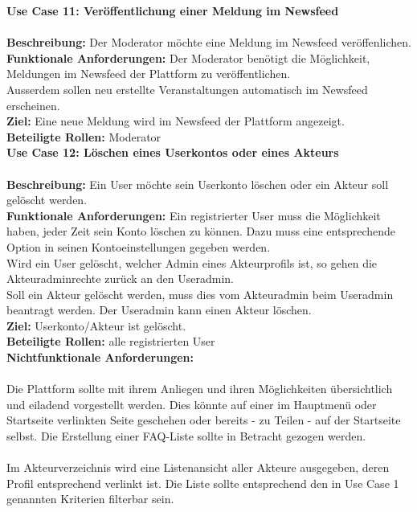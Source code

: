 \documentclass{swp}
\begin{document}
\textbf{Use Case 11: Ver\"offentlichung einer Meldung im Newsfeed}\\\\
\textbf{Beschreibung: }Der Moderator m\"ochte eine Meldung im Newsfeed ver\"offenlichen.\\
\textbf{Funktionale Anforderungen: }Der Moderator ben\"otigt die M\"oglichkeit, Meldungen im Newsfeed der Plattform zu ver\"offentlichen.\\
Au{ss}erdem sollen neu erstellte Veranstaltungen automatisch im Newsfeed erscheinen.\\
\textbf{Ziel: }Eine neue Meldung wird im Newsfeed der Plattform angezeigt.\\
\textbf{Beteiligte Rollen: }Moderator\\

\textbf{Use Case 12: L\"oschen eines Userkontos oder eines Akteurs}\\\\
\textbf{Beschreibung: }Ein User m\"ochte sein Userkonto l\"oschen oder ein Akteur soll gel\"oscht werden.\\
\textbf{Funktionale Anforderungen: }Ein registrierter User muss die M\"oglichkeit haben, jeder Zeit sein Konto l\"oschen zu k\"onnen. Dazu muss eine entsprechende Option in seinen Kontoeinstellungen gegeben werden.\\
Wird ein User gel\"oscht, welcher Admin eines Akteurprofils ist, so gehen die Akteuradminrechte zur\"uck an den Useradmin.\\
Soll ein Akteur gel\"oscht werden, muss dies vom Akteuradmin beim Useradmin beantragt werden. Der Useradmin kann einen Akteur l\"oschen.\\
\textbf{Ziel: }Userkonto/Akteur ist gel\"oscht.\\
\textbf{Beteiligte Rollen: }alle registrierten User\\

\textbf{Nichtfunktionale Anforderungen:}\\\\
Die Plattform sollte mit ihrem Anliegen und ihren M\"oglichkeiten \"ubersichtlich und eiladend vorgestellt werden. Dies k\"onnte auf einer im Hauptmen\"u oder Startseite verlinkten Seite geschehen oder bereits - zu Teilen - auf der Startseite selbst. Die Erstellung einer FAQ-Liste sollte in Betracht gezogen werden.\\\\
Im Akteurverzeichnis wird eine Listenansicht aller Akteure ausgegeben, deren Profil entsprechend verlinkt ist. Die Liste sollte entsprechend den in Use Case 1 genannten Kriterien filterbar sein.\\\\
\end{document}
